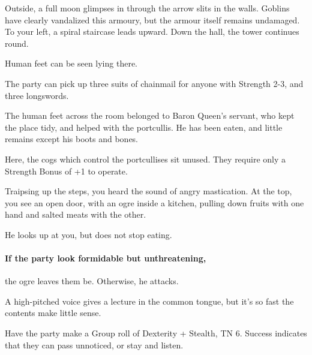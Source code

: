 \begin{multicols}{2}
\begin{boxtext}
	Outside, a full moon glimpses in through the arrow slits in the walls.
	Goblins have clearly vandalized this armoury, but the armour itself remains undamaged.
	To your left, a spiral staircase leads upward.
	Down the hall, the tower continues round.

	Human feet can be seen lying there.

\end{boxtext}


The party can pick up three suits of chainmail for anyone with Strength 2-3, and three longswords.

The human feet across the room belonged to Baron Queen's servant, who kept the place tidy, and helped with the portcullis.
He has been eaten, and little remains except his boots and bones.


Here, the cogs which control the portcullises sit unused.
They require only a Strength Bonus of +1 to operate.


\begin{boxtext}

	Traipsing up the steps, you heard the sound of angry mastication.
	At the top, you see an open door, with an ogre inside a kitchen, pulling down fruits with one hand and salted meats with the other.

	He looks up at you, but does not stop eating.

\end{boxtext}

\paragraph{If the party look formidable but unthreatening,}
the ogre leaves them be.
Otherwise, he attacks.



\begin{boxtext}

	A high-pitched voice gives a lecture in the common tongue, but it's so fast the contents make little sense.

\end{boxtext}

\noindent
Have the party make a Group roll of Dexterity + Stealth, TN 6.
Success indicates that they can pass unnoticed, or stay and listen.


\end{multicols}
